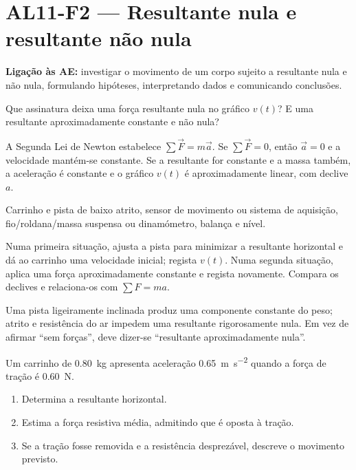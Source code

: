 \documentclass[11pt,a4paper,openany]{book}
\newcounter{exercicio}[chapter]
\renewcommand{\theexercicio}{\thechapter.\arabic{exercicio}}
\newenvironment{exercicio}[1][]%
{\refstepcounter{exercicio}%
\begin{tcolorbox}[breakable,colback=white,colframe=eublue!70,
 title={Exercício \theexercicio\if\relax\detokenize{#1}\relax\else\ --- #1\fi},fonttitle=\bfseries]}%
{\end{tcolorbox}}
\newcommand{\LigAE}[1]{\textbf{Ligação às AE:} #1}
\begin{document}
\section{AL11-F2 — Resultante nula e resultante não nula}
\LigAE{investigar o movimento de um corpo sujeito a resultante nula e não nula, formulando hipóteses, interpretando dados e comunicando conclusões.}

\begin{questao}
Que assinatura deixa uma força resultante nula no gráfico $v(t)$? E uma resultante aproximadamente constante e não nula?
\end{questao}

\begin{fundamento}
A Segunda Lei de Newton estabelece $\sum\vec F=m\vec a$. Se $\sum\vec F=0$, então $\vec a=0$ e a velocidade mantém-se constante. Se a resultante for constante e a massa também, a aceleração é constante e o gráfico $v(t)$ é aproximadamente linear, com declive $a$.
\end{fundamento}

\begin{material}
Carrinho e pista de baixo atrito, sensor de movimento ou sistema de aquisição, fio/roldana/massa suspensa ou dinamómetro, balança e nível.
\end{material}

\begin{metodo}
Numa primeira situação, ajusta a pista para minimizar a resultante horizontal e dá ao carrinho uma velocidade inicial; regista $v(t)$. Numa segunda situação, aplica uma força aproximadamente constante e regista novamente. Compara os declives e relaciona-os com $\sum F=ma$.
\end{metodo}

\begin{erros}
Uma pista ligeiramente inclinada produz uma componente constante do peso; atrito e resistência do ar impedem uma resultante rigorosamente nula. Em vez de afirmar ``sem forças'', deve dizer-se ``resultante aproximadamente nula''.
\end{erros}

\begin{exercicio}[Força resistiva]
Um carrinho de \SI{0.80}{kg} apresenta aceleração \SI{0.65}{m.s^{-2}} quando a força de tração é \SI{0.60}{N}.
\begin{enumerate}[label=\alph*)]
\item Determina a resultante horizontal.
\item Estima a força resistiva média, admitindo que é oposta à tração.
\item Se a tração fosse removida e a resistência desprezável, descreve o movimento previsto.
\end{enumerate}
\end{exercicio}
\end{document}
